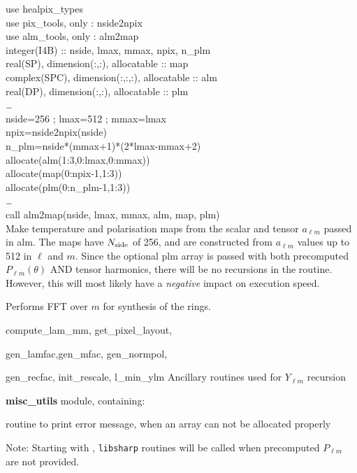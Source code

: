 \begin{example}
{
use healpix\_types \\
use pix\_tools, only : nside2npix \\
use alm\_tools, only : alm2map \\
integer(I4B) :: nside, lmax, mmax, npix, n\_plm\\
real(SP), dimension(:,:), allocatable :: map \\
complex(SPC), dimension(:,:,:), allocatable :: alm \\
real(DP), dimension(:,:), allocatable :: plm \\
\ldots \\
nside=256 ; lmax=512 ; mmax=lmax\\
npix=nside2npix(nside)\\
n\_plm=nside*(mmax+1)*(2*lmax-mmax+2)\\
allocate(alm(1:3,0:lmax,0:mmax))\\
allocate(map(0:npix-1,1:3))\\
allocate(plm(0:n\_plm-1,1:3))\\
\ldots \\
call alm2map(nside, lmax, mmax, alm, map, plm)  \\
}
{
Make temperature and polarisation maps from the scalar and tensor $a_{\ell m}$
passed in alm. The maps have $N_\mathrm{side}$ of 256, and are constructed from
$a_{\ell m}$ values up to 512 in $\ell$ and $m$. Since the optional plm array is
passed with both precomputed $P_{\ell m}(\theta)$ AND tensor harmonics, there will
be no recursions in the routine. However, this will most likely have a
\emph{negative} impact on execution speed.
}
\end{example}

\begin{modules}
  \begin{sulist}{} %
  \item[\htmlref{ring\_synthesis}{sub:ring_synthesis}] Performs FFT over $m$ for synthesis of the rings.
  \item[compute\_lam\_mm, get\_pixel\_layout, ]
  \item[gen\_lamfac,gen\_mfac, gen\_normpol, ] 
  \item[gen\_recfac, init\_rescale, l\_min\_ylm] Ancillary routines used
  for $Y_{\ell m}$ recursion
  \item[\textbf{misc\_utils}] module, containing:
  \item[\htmlref{assert\_alloc}{sub:assert}] routine to print error message, when an array can not be
  allocated properly
  \end{sulist}
Note: Starting with , {\tt libsharp} routines will be called when precomputed $P_{\ell m}$ are not provided.
\end{modules}

